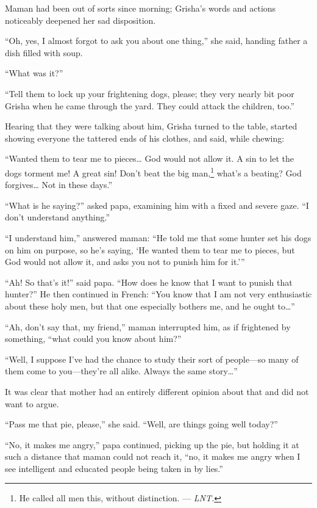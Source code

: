 Maman had been out of sorts since morning; Grisha's words and actions noticeably deepened her sad disposition. 

``Oh, yes, I almost forgot to ask you about one thing,'' she said, handing father a dish filled with soup. %

``What was it?'' %

``Tell them to lock up your frightening dogs, please; they very nearly bit poor Grisha when he came through the yard. They could attack the children, too.'' %

Hearing that they were talking about him, Grisha turned to the table, started showing everyone the tattered ends of his clothes, and said, while chewing:

``Wanted them to tear me to pieces\ldots{} God would not allow it. A sin to let the dogs torment me! A great sin! Don't beat the big man,\footnote{He called all men this, without distinction. --- \textit{LNT.}} what's a beating? God forgives\ldots{} Not in these days.'' %

``What is he saying?'' asked papa, examining him with a fixed and severe gaze. ``I don't understand anything.'' %

``I understand him,'' answered maman: ``He told me that some hunter set his dogs on him on purpose, so he's saying, `He wanted them to tear me to pieces, but God would not allow it, and asks you not to punish him for it.''' %

``Ah! So that's it!'' said papa. ``How does he know that I want to punish that hunter?'' He then continued in French: ``You know that I am not very enthusiastic about these holy men, but that one especially bothers me, and he ought to\ldots{}'' %

``Ah, don't say that, my friend,'' maman interrupted him, as if frightened by something, ``what could you know about him?'' %

``Well, I suppose I've had the chance to study their sort of people---so many of them come to you---they're all alike. Always the same story\ldots{}'' %

It was clear that mother had an entirely different opinion about that and did not want to argue.

``Pass me that pie, please,'' she said. ``Well, are things going well today?'' %

``No, it makes me angry,'' papa continued, picking up the pie, but holding it at such a distance that maman could not reach it, ``no, it makes me angry when I see intelligent and educated people being taken in by lies.'' %

